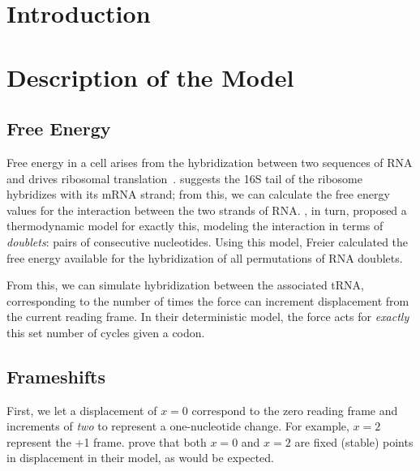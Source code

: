 \documentclass[12pt, draft]{article}
\numberwithin{equation}{section}
\begin{document}
\tableofcontents

\section{Introduction}

\section{Description of the Model}
\label{allmodel}
\subsection{Free Energy}
\label{freeenergy}

Free energy in a cell arises from the hybridization between two
sequences of RNA and drives ribosomal translation~\cite{starmer}.
\citet{weiss88} suggests the 16S tail of the ribosome hybridizes with its mRNA strand;
from this, we can calculate the free energy values for the interaction between the two strands of RNA.
\citet{freier}, in turn, proposed a thermodynamic model for exactly this,
modeling the interaction in terms of \emph{doublets}: pairs of consecutive nucleotides.
Using this model, Freier calculated the free energy available
for the hybridization of all permutations of RNA doublets.

From this, we can simulate hybridization between the associated tRNA, corresponding to the number
of times the force can increment displacement from the current reading frame.
In their deterministic model, the force acts for \emph{exactly} this set number of cycles given a codon.

\subsection{Frameshifts}


First, we let a displacement of $x = 0$ correspond to the zero reading frame and increments of
\emph{two} to represent a one-nucleotide change. For example, $x =2$ represent the +1 frame.
\citet{lalit:embs} prove that both $x = 0$ and $x = 2$ are fixed (stable) points in displacement in their model,
as would be expected.
\end{document}
